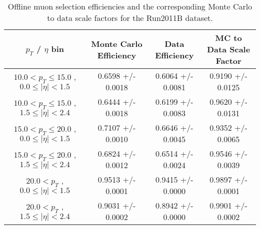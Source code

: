  \begin{table}[!ht]
 \begin{center} 
 \begin{tabular}{|c|c|c|c|}
 \hline
 $p_{T}$ / $\eta$ bin    &  Monte Carlo Efficiency    &  Data Efficiency   &  MC to Data Scale Factor \\   \hline           
$ 10.0 < p_{T} \le  15.0$ , $  0.0  \le |\eta| <   1.5$   &       0.6598 +/- 0.0018   &       0.6064 +/- 0.0081   &       0.9190 +/- 0.0125   \\   
\hline
$ 10.0 < p_{T} \le  15.0$ , $  1.5  \le |\eta| <   2.4$   &       0.6444 +/- 0.0018   &       0.6199 +/- 0.0083   &       0.9620 +/- 0.0131   \\   
\hline
$ 15.0 < p_{T} \le  20.0$ , $  0.0  \le |\eta| <   1.5$   &       0.7107 +/- 0.0010   &       0.6646 +/- 0.0045   &       0.9352 +/- 0.0065   \\   
\hline
$ 15.0 < p_{T} \le  20.0$ , $  1.5  \le |\eta| <   2.4$   &       0.6824 +/- 0.0012   &       0.6514 +/- 0.0024   &       0.9546 +/- 0.0039   \\   
\hline
$ 20.0 < p_{T} $ , $  0.0  \le |\eta| <   1.5$   &       0.9513 +/- 0.0001   &       0.9415 +/- 0.0000   &       0.9897 +/- 0.0001   \\   
\hline
$ 20.0 < p_{T} $ , $  1.5  \le |\eta| <   2.4$   &       0.9031 +/- 0.0002   &       0.8942 +/- 0.0000   &       0.9901 +/- 0.0002   \\   
\hline
\end{tabular}
\caption{Offline muon selection efficiencies and the corresponding Monte Carlo to data scale factors for the
Run2011B dataset.}
\label{tab:eff_mu_offline_Run2011B}
\end{center}
\end{table}


